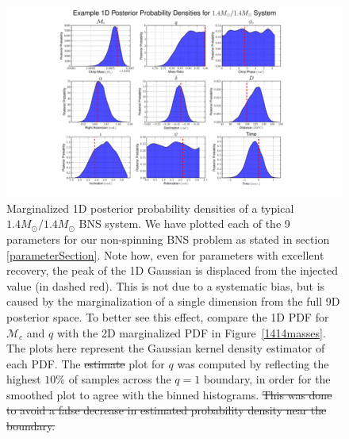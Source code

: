 \documentclass[11pt,a4paper]{emulateapj} 
\newcommand{\carl}[1]{{\color{red} #1}}
\begin{document}
\begin{figure}[t!]
\centering \includegraphics[trim=7cm 0cm 0cm 0cm,
  clip=true,scale=0.58]{9dpdf}
\caption{\label{9dPDF} Marginalized 1D  posterior probability densities
  of a typical $1.4M_{\odot}/1.4M_{\odot}$ BNS
  system.  We have plotted each of the 9 parameters for our
  non-spinning BNS problem as stated in section \ref{parameterSection}.
    Note how, even for parameters with excellent recovery, the peak of
  the 1D Gaussian is displaced from the injected value (in dashed
  red).  This is not due to a systematic bias, but is caused by the
  marginalization of a single dimension from the full 9D posterior
  space.  To better see this effect, compare the 1D PDF for
  $\mathcal{M}_{c}$ and $q$ with the 2D marginalized PDF in
  Figure~\ref{1414masses}.  The plots here represent the Gaussian kernel density
  estimator of each PDF.  The \sout{estimate} \carl{plot} for $q$ was 
  computed by reflecting the highest $10\%$ of samples across the $q=1$ boundary, \carl{in order
  for the smoothed plot to agree with the binned histograms.}
  \sout{This was done to avoid a false decrease in estimated probability density near
  the boundary.}}
\end{figure}
\end{document}
